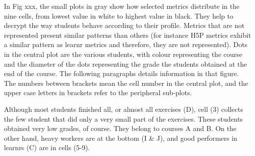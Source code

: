 \documentclass[
]{article}
\begin{document}
In Fig xxx, the small plots in gray show how selected metrics distribute
in the nine cells, from lowest value in white to highest value in black.
They help to decrypt the way students behave according to their profile.
Metrics that are not represented present similar patterns than others
(for instance H5P metrics exhibit a similar pattern as learnr metrics
and therefore, they are not represented). Dots in the central plot are
the various students, with colour representing the course and the
diameter of the dots representing the grade the students obtained at the
end of the course. The following paragraphs details information in that
figure. The numbers between brackets mean the cell number in the central
plot, and the upper case letters in brackets refer to the peripheral
sub-plots.

Although most students finished all, or almost all exercises (D), cell
(3) collects the few student that did only a very small part of the
exercises. These students obtained very low grades, of course. They
belong to courses A and B. On the other hand, heavy workers are at the
bottom (I \& J), and good performers in learnrs (C) are in cells (5-9).
\end{document}
